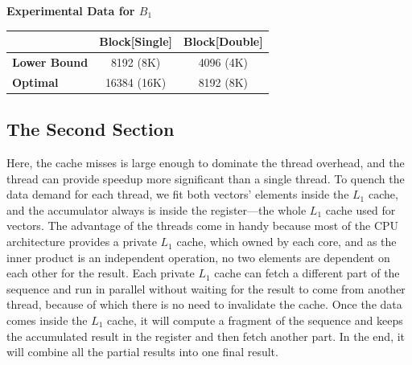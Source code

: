 \textbf{Experimental Data for $B_1$}

\begin{figure}[htb]
    \centering
    \label{fig:dot_Stuning_block1}
    \qquad
    \label{fig:dot_Dtuning_block1}
\end{figure}

\begin{tabular}{l|c|c|}
    & \textbf{Block[Single]} & \textbf{Block[Double]}\\
    \hline
    \textbf{Lower Bound} & 8192 (8K) & 4096 (4K)\\
    \hline
    \textbf{Optimal} & 16384 (16K) & 8192 (8K)\\
    \hline
\end{tabular}

\subsection{The Second Section}

Here, the cache misses is large enough to dominate the thread overhead, 
and the thread can provide speedup more significant than a single thread. 
To quench the data demand for each thread, we fit both vectors' elements 
inside the $L_1$ cache, and the accumulator always is inside the register—the 
whole $L_1$ cache used for vectors. The advantage of the threads come in handy 
because most of the CPU architecture provides a private $L_1$ cache, which 
owned by each core, and as the inner product is an independent operation, 
no two elements are dependent on each other for the result. 
Each private $L_1$ cache can fetch a different part of the sequence 
and run in parallel without waiting for the result to come from another thread, 
because of which there is no need to invalidate the cache. Once the data comes 
inside the $L_1$ cache, it will compute a fragment of the sequence and keeps 
the accumulated result in the register and then fetch another part. 
In the end, it will combine all the partial results into one final result.

